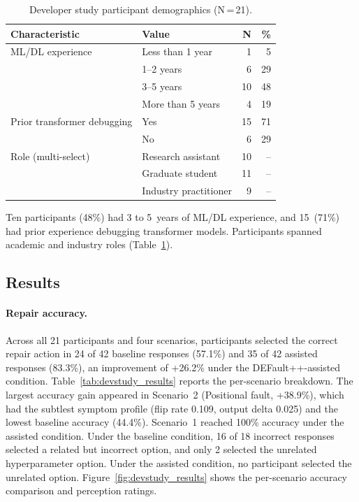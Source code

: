 \begin{table}[!htbp]
\centering
\caption{Developer study participant demographics (N\,=\,21).}
\label{tab:devstudy_demographics}
\small
\begin{tabular}{@{}l l r r@{}}
\toprule
\textbf{Characteristic} & \textbf{Value} & \textbf{N} & \textbf{\%} \\
\midrule
ML/DL experience & Less than 1 year & 1 & 5 \\
                 & 1--2 years       & 6 & 29 \\
                 & 3--5 years       & 10 & 48 \\
                 & More than 5 years & 4 & 19 \\
\addlinespace
Prior transformer debugging & Yes & 15 & 71 \\
                            & No  & 6  & 29 \\
\addlinespace
Role (multi-select) & Research assistant      & 10 & -- \\
                    & Graduate student        & 11 & -- \\
                    & Industry practitioner   & 9  & -- \\
\bottomrule
\end{tabular}
\end{table}

Ten participants (48\%) had 3 to 5~years of ML/DL experience, and 15~(71\%) had prior experience debugging transformer models. Participants spanned academic and industry roles (Table~\ref{tab:devstudy_demographics}).


\subsection{Results}
\label{sec:defaultpp_devstudy_results}

\paragraph{Repair accuracy.}
Across all 21 participants and four scenarios, participants selected the correct repair action in 24 of 42 baseline responses (57.1\%) and 35 of 42 assisted responses (83.3\%), an improvement of +26.2\% under the DEFault++-assisted condition. Table~\ref{tab:devstudy_results} reports the per-scenario breakdown. The largest accuracy gain appeared in Scenario~2 (Positional fault, +38.9\%), which had the subtlest symptom profile (flip rate 0.109, output delta 0.025) and the lowest baseline accuracy (44.4\%). Scenario~1 reached 100\% accuracy under the assisted condition. Under the baseline condition, 16 of 18 incorrect responses selected a related but incorrect option, and only 2 selected the unrelated hyperparameter option. Under the assisted condition, no participant selected the unrelated option. Figure~\ref{fig:devstudy_results} shows the per-scenario accuracy comparison and perception ratings.

